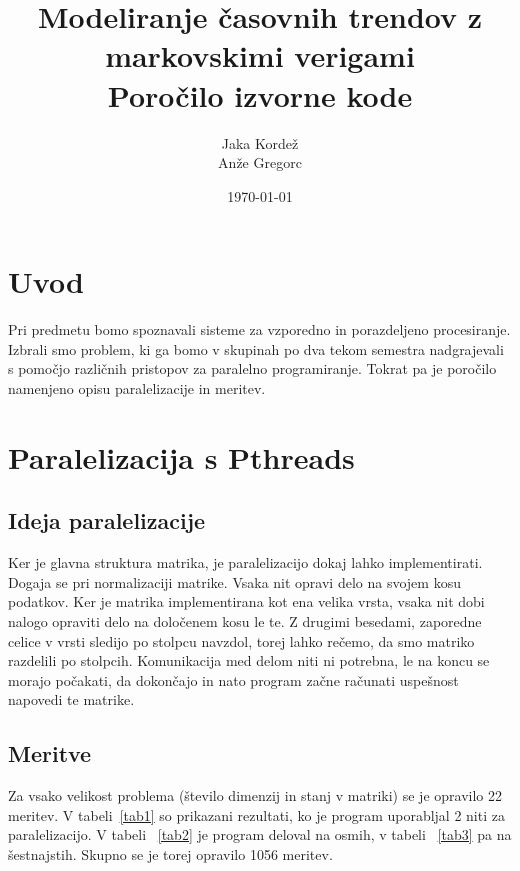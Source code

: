 \documentclass[a4paper,11pt]{article}
\title{Modeliranje časovnih trendov z markovskimi verigami \\ \large  Poročilo izvorne kode}
\author{Jaka Kordež \\ Anže Gregorc}
\date{\today}
\begin{document}
\maketitle

\tableofcontents

\section{Uvod}

Pri predmetu bomo spoznavali sisteme za vzporedno in porazdeljeno procesiranje. Izbrali smo problem, ki ga bomo v skupinah po dva tekom semestra nadgrajevali s pomočjo različnih pristopov za paralelno programiranje. Tokrat pa je poročilo namenjeno opisu paralelizacije in meritev.

\section{Paralelizacija s Pthreads}

\subsection{Ideja paralelizacije}

Ker je glavna struktura matrika, je paralelizacijo dokaj lahko implementirati. Dogaja se pri normalizaciji matrike. Vsaka nit opravi delo na svojem kosu podatkov. Ker je matrika implementirana kot ena velika vrsta, vsaka nit dobi nalogo opraviti delo na določenem kosu le te. Z drugimi besedami, zaporedne celice v vrsti sledijo po stolpcu navzdol, torej lahko rečemo, da smo matriko razdelili po stolpcih. Komunikacija med delom niti ni potrebna, le na koncu se morajo počakati, da dokončajo in nato program začne računati uspešnost napovedi te matrike.

\subsection{Meritve}
Za vsako velikost problema (število dimenzij in stanj v matriki) se je opravilo 22 meritev. V tabeli~\ref{tab1} so prikazani rezultati, ko je program uporabljal 2 niti za paralelizacijo. V tabeli ~\ref{tab2} je program deloval na osmih, v tabeli ~\ref{tab3} pa na šestnajstih. Skupno se je torej opravilo 1056 meritev.
\end{document}
